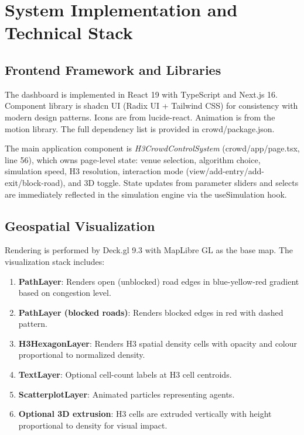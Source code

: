 \documentclass[conference]{IEEEtran}
\begin{document}
\section{System Implementation and Technical Stack}

\subsection{Frontend Framework and Libraries}

The dashboard is implemented in React 19 with TypeScript and Next.js 16. Component library is shadcn UI (Radix UI + Tailwind CSS) for consistency with modern design patterns. Icons are from lucide-react. Animation is from the motion library. The full dependency list is provided in crowd/package.json.

The main application component is \textit{H3CrowdControlSystem} (crowd/app/page.tsx, line 56), which owns page-level state: venue selection, algorithm choice, simulation speed, H3 resolution, interaction mode (view/add-entry/add-exit/block-road), and 3D toggle. State updates from parameter sliders and selects are immediately reflected in the simulation engine via the useSimulation hook.

\subsection{Geospatial Visualization}

Rendering is performed by Deck.gl 9.3 with MapLibre GL as the base map. The visualization stack includes:

\begin{enumerate}
\item \textbf{PathLayer}: Renders open (unblocked) road edges in blue-yellow-red gradient based on congestion level.
\item \textbf{PathLayer (blocked roads)}: Renders blocked edges in red with dashed pattern.
\item \textbf{H3HexagonLayer}: Renders H3 spatial density cells with opacity and colour proportional to normalized density.
\item \textbf{TextLayer}: Optional cell-count labels at H3 cell centroids.
\item \textbf{ScatterplotLayer}: Animated particles representing agents.
\item \textbf{Optional 3D extrusion}: H3 cells are extruded vertically with height proportional to density for visual impact.
\end{enumerate}
\end{document}
